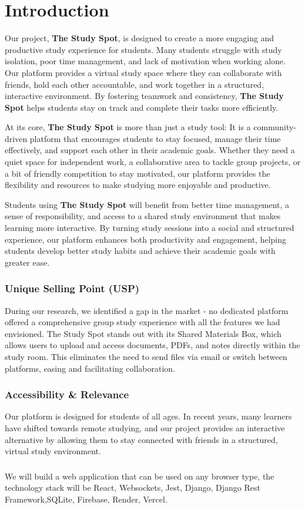 \chapter{Introduction}
\label{chap:introduction}
Our project, \textbf{The Study Spot}, is designed to create a more engaging and productive study experience for students. Many students struggle with study isolation, poor time management, and lack of motivation when working alone. Our platform provides a virtual study space where they can collaborate with friends, hold each other accountable, and work together in a structured, interactive environment. By fostering teamwork and consistency, \textbf{The Study Spot} helps students stay on track and complete their tasks more efficiently.  

At its core, \textbf{The Study Spot} is more than just a study tool: It is a community-driven platform that encourages students to stay focused, manage their time effectively, and support each other in their academic goals. Whether they need a quiet space for independent work, a collaborative area to tackle group projects, or a bit of friendly competition to stay motivated, our platform provides the flexibility and resources to make studying more enjoyable and productive.  

Students using \textbf{The Study Spot} will benefit from better time management, a sense of responsibility, and access to a shared study environment that makes learning more interactive. By turning study sessions into a social and structured experience, our platform enhances both productivity and engagement, helping students develop better study habits and achieve their academic goals with greater ease.

\subsection*{Unique Selling Point (USP)}
During our research, we identified a gap in the market - no dedicated platform offered a comprehensive group study experience with all the features we had envisioned. The Study Spot stands out with its Shared Materials Box, which allows users to upload and access documents, PDFs, and notes directly within the study room. This eliminates the need to send files via email or switch between platforms, easing and facilitating collaboration.

\subsection*{Accessibility \& Relevance}
Our platform is designed for students of all ages. In recent years, many learners have shifted towards remote studying, and our project provides an interactive alternative by allowing them to stay connected with friends in a structured, virtual study environment.

\subsection*{} We will build a web application that can be used on any browser type, the technology stack will be React, Websockets, Jest, Django, Django Rest Framework,SQLite, Firebase, Render, Vercel.